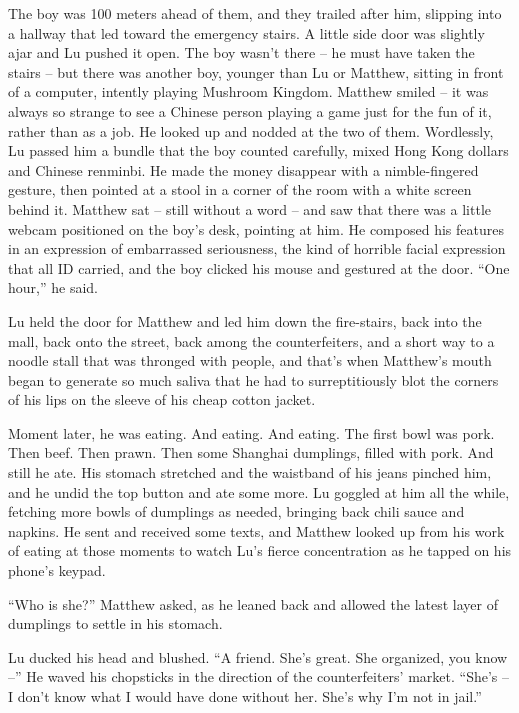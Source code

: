 The boy was 100 meters ahead of them, and they trailed after him,
slipping into a hallway that led toward the emergency stairs. A
little side door was slightly ajar and Lu pushed it open. The boy
wasn't there -- he must have taken the stairs -- but there was
another boy, younger than Lu or Matthew, sitting in front of a
computer, intently playing Mushroom Kingdom. Matthew smiled -- it
was always so strange to see a Chinese person playing a game just
for the fun of it, rather than as a job. He looked up and nodded at
the two of them. Wordlessly, Lu passed him a bundle that the boy
counted carefully, mixed Hong Kong dollars and Chinese renminbi. He
made the money disappear with a nimble-fingered gesture, then
pointed at a stool in a corner of the room with a white screen
behind it. Matthew sat -- still without a word -- and saw that
there was a little webcam positioned on the boy's desk, pointing at
him. He composed his features in an expression of embarrassed
seriousness, the kind of horrible facial expression that all ID
carried, and the boy clicked his mouse and gestured at the door.
``One hour,'' he said.

Lu held the door for Matthew and led him down the fire-stairs, back
into the mall, back onto the street, back among the counterfeiters,
and a short way to a noodle stall that was thronged with people,
and that's when Matthew's mouth began to generate so much saliva
that he had to surreptitiously blot the corners of his lips on the
sleeve of his cheap cotton jacket.

Moment later, he was eating. And eating. And eating. The first bowl
was pork. Then beef. Then prawn. Then some Shanghai dumplings,
filled with pork. And still he ate. His stomach stretched and the
waistband of his jeans pinched him, and he undid the top button and
ate some more. Lu goggled at him all the while, fetching more bowls
of dumplings as needed, bringing back chili sauce and napkins. He
sent and received some texts, and Matthew looked up from his work
of eating at those moments to watch Lu's fierce concentration as he
tapped on his phone's keypad.

``Who is she?'' Matthew asked, as he leaned back and allowed the
latest layer of dumplings to settle in his stomach.

Lu ducked his head and blushed. ``A friend. She's great. She
organized, you know --'' He waved his chopsticks in the direction of
the counterfeiters' market. ``She's -- I don't know what I would
have done without her. She's why I'm not in jail.''

